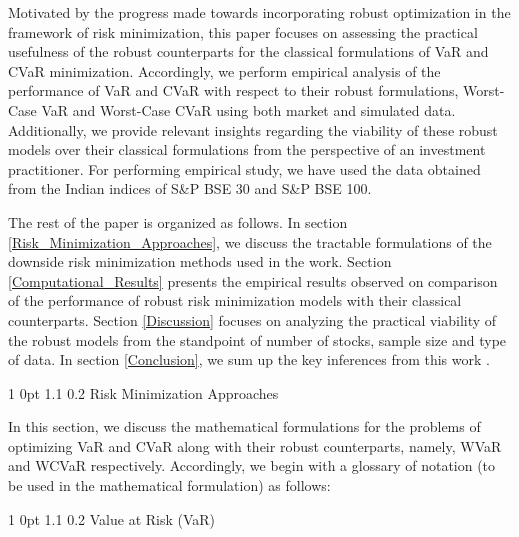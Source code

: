 \documentclass[12pt]{article}
\makeatletter
\numberwithin{equation}{section}
\renewcommand{\section}{
  \@startsection
  {section}%
  {1}%
  {0pt}%
  {1.1\baselineskip}%
  {0.2\baselineskip}%
  {\sc \centering}%
}
\renewcommand{\subsection}{
  \@startsection
  {subsection}%
  {1}%
  {0pt}%
  {1.1\baselineskip}%
  {0.2\baselineskip}%
  {\sc \centering}%
}
\makeatother
\begin{document}
Motivated by the progress made towards incorporating robust optimization in the framework of risk minimization, this paper focuses on assessing the practical usefulness of the robust counterparts for the classical formulations of VaR and CVaR minimization. Accordingly, we perform empirical analysis of the performance of VaR and CVaR with respect to their robust formulations, Worst-Case VaR and Worst-Case CVaR using both market and simulated data. Additionally, we provide relevant insights regarding the viability of these robust models over their classical formulations from the perspective of an investment practitioner. For performing empirical study, we have used the data obtained from the Indian indices of S\&P BSE 30 and S\&P BSE 100.

The rest of the paper is organized as follows. In section \ref{Risk_Minimization_Approaches}, we discuss the tractable formulations of the downside risk minimization methods used in the work. Section \ref{Computational_Results} presents the empirical results observed on comparison of the performance of robust risk minimization models with their classical counterparts. Section \ref{Discussion} focuses on analyzing the practical viability of the robust models from the standpoint of number of stocks, sample size and type of data. In section \ref{Conclusion}, we sum up the key inferences from this work .

\section{Risk Minimization Approaches}
\label{Risk_Minimization_Approaches}

In this section, we discuss the mathematical formulations for the problems of optimizing VaR and CVaR along with their robust counterparts, namely,
WVaR and WCVaR respectively. Accordingly, we begin with a glossary of notation (to be used in the mathematical formulation) as follows:

\subsection{Value at Risk (VaR)}
\end{document}
